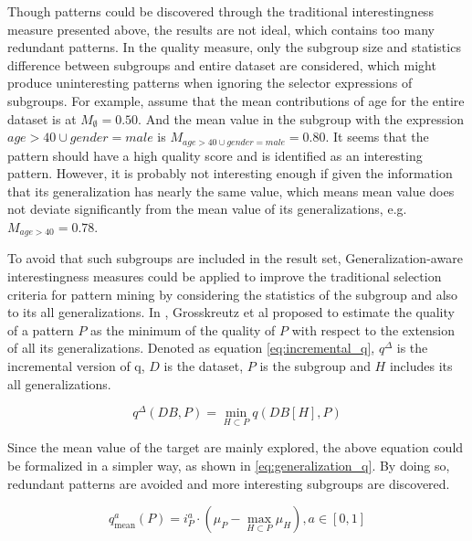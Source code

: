 Though patterns could be discovered through the traditional interestingness measure presented above, the results are not ideal, which contains too many redundant patterns. In the quality measure, only the subgroup size and statistics difference between subgroups and entire dataset are considered, which might produce uninteresting patterns when ignoring the selector expressions of subgroups. For example, assume that the mean contributions of age for the entire dataset is at $M_{\emptyset}=0.50$. And the mean value in the subgroup with the expression $age > 40 \cup gender=male$ is $M_{age > 40 \cup gender=male}=0.80$. It seems that the pattern should have a high quality score and is identified as an interesting pattern. However, it is probably not interesting enough if given the information that its generalization has nearly the same value, which means mean value does not deviate significantly from the mean value of its generalizations, e.g. $M_{age > 40} = 0.78$. 

To avoid that such subgroups are included in the result set, Generalization-aware interestingness measures could be applied to improve the traditional selection criteria for pattern mining by considering the statistics of the subgroup and also to its all generalizations. In \cite{grosskreutz2010subgroup}, Grosskreutz et al proposed to estimate the quality of a pattern $P$ as the minimum of the quality of $P$ with respect to the extension of all its generalizations. Denoted as equation \ref{eq:incremental_q}, $q^{\Delta}$ is the incremental version of q, $D$ is the dataset, $P$ is the subgroup and $H$ includes its all generalizations. 

 \begin{equation} \label{eq:incremental_q}
 q^{\Delta}(D B, P)=\min _{H \subset P} q\left(D B\left[H\right], P\right)
 \end{equation}
 
Since the mean value of the target are mainly explored, the above equation could be formalized in a simpler way, as shown in \ref{eq:generalization_q}. By doing so, redundant patterns are avoided and more interesting subgroups are discovered. 

\begin{equation} \label{eq:generalization_q}
q_{\operatorname{mean}}^{a}(P)=i_{P}^{a} \cdot\left(\mu_{P}-\max _{H \subset P} \mu_{H}\right), a \in[0,1]
\end{equation}

